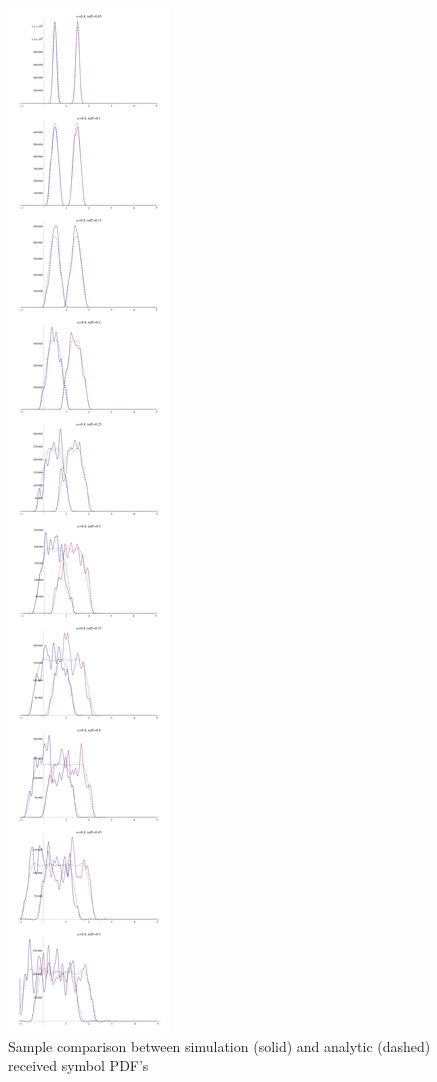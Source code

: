 \begin{figure}[htbp]
\centering
\includegraphics[height=\textheight]{../../../plots/comparison_f08.png}
\caption{Sample comparison between simulation (solid) and analytic
(dashed) received symbol PDF's}
\end{figure}

